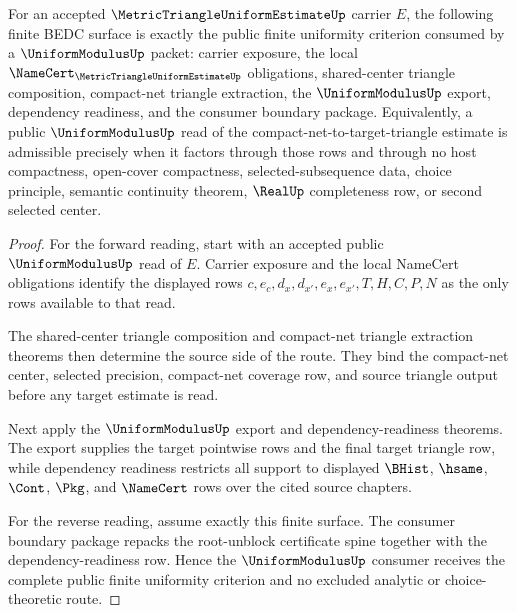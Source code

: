\begin{theorem}
\label{thm:metric-triangle-uniform-estimate-public-uniformity-criterion}
For an accepted $\MetricTriangleUniformEstimateUp$ carrier $E$, the following finite BEDC surface is exactly the public finite uniformity criterion consumed by a $\UniformModulusUp$ packet:
carrier exposure, the local $\NameCert_{\MetricTriangleUniformEstimateUp}$ obligations, shared-center triangle composition, compact-net triangle extraction, the $\UniformModulusUp$ export, dependency readiness, and the consumer boundary package. Equivalently, a public $\UniformModulusUp$ read of the compact-net-to-target-triangle estimate is admissible precisely when it factors through those rows and through no host compactness, open-cover compactness, selected-subsequence data, choice principle, semantic continuity theorem, $\RealUp$ completeness row, or second selected center.
\end{theorem}
\begin{proof}
For the forward reading, start with an accepted public $\UniformModulusUp$ read of $E$. Carrier exposure and the local NameCert obligations identify the displayed rows $c,e_c,d_x,d_{x'},e_x,e_{x'},T,H,C,P,N$ as the only rows available to that read.

The shared-center triangle composition and compact-net triangle extraction theorems then determine the source side of the route. They bind the compact-net center, selected precision, compact-net coverage row, and source triangle output before any target estimate is read.

Next apply the $\UniformModulusUp$ export and dependency-readiness theorems. The export supplies the target pointwise rows and the final target triangle row, while dependency readiness restricts all support to displayed $\BHist$, $\hsame$, $\Cont$, $\Pkg$, and $\NameCert$ rows over the cited source chapters.

For the reverse reading, assume exactly this finite surface. The consumer boundary package repacks the root-unblock certificate spine together with the dependency-readiness row. Hence the $\UniformModulusUp$ consumer receives the complete public finite uniformity criterion and no excluded analytic or choice-theoretic route.
\end{proof}

